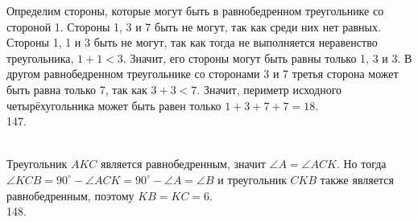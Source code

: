 \documentclass[12pt]{article}
\begin{document}
Определим стороны, которые могут быть в равнобедренном треугольнике со стороной 1. Стороны 1, 3 и 7 быть не могут, так как среди них нет равных. Стороны 1, 1 и 3 быть не могут, так как тогда не выполняется неравенство треугольника,  $1+1<3.$ Значит, его стороны могут быть равны только 1, 3 и 3. В другом равнобедренном треугольнике со сторонами 3 и 7 третья сторона может быть равна только 7, так как $3+3<7.$ Значит, периметр исходного четырёхугольника может быть равен только $1+3+7+7=18.$\\
147. \begin{figure}[ht!]
\end{figure}\\
Треугольник $AKC$ является равнобедренным, значит $\angle A=\angle ACK.$ Но тогда $\angle KCB=90^\circ-\angle ACK=90^\circ-\angle A=\angle B$ и треугольник $CKB$ также является равнобедренным, поэтому $KB=KC=6.$\\
148. \begin{figure}[ht!]
\end{figure}\\
\end{document}
